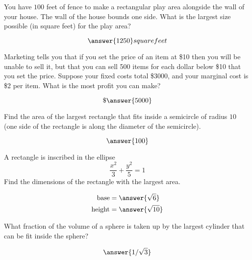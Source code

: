 \documentclass[handout]{ximera}
\begin{document}
\begin{exercise}
You have $100$ feet of fence to make a rectangular play area
  alongside the wall of your house.  The wall of the house bounds one
  side.  What is the largest size possible (in square feet) for the
  play area?

  \[
  \answer{1250} square feet
  \]

\end{exercise}


\begin{exercise}
Marketing tells you that if you set the price of an item at \$10
  then you will be unable to sell it, but that you can sell 500 items
  for each dollar below \$10 that you set the price.  Suppose your
  fixed costs total \$3000, and your marginal cost is \$2 per item.
  What is the most profit you can make?
  \begin{prompt}
  \[
  \$ \answer{5000}
  \]
  \end{prompt}
\end{exercise}

\begin{exercise}
Find the area of the largest rectangle that fits inside a semicircle
  of radius $10$ (one side of the rectangle is along the diameter of
  the semicircle).

  \[
  \answer{100}
  \]

\end{exercise}

\begin{exercise}
A rectangle is inscribed in the ellipse
  \[
  \frac{x^2}{3}+\frac{y^2}{5}=1
  \]
  Find the dimensions of the rectangle with the largest area.

  \begin{align*}
  \text{base} &= \answer{\sqrt{6}}\\
  \text{height} &= \answer{\sqrt{10}}
  \end{align*}

\end{exercise}

\begin{exercise}
What fraction of the volume of a sphere is taken up by the largest cylinder
  that can be fit inside the sphere?

  \[
  \answer{1/\sqrt{3}}
  \]

\end{exercise}
\end{document}

